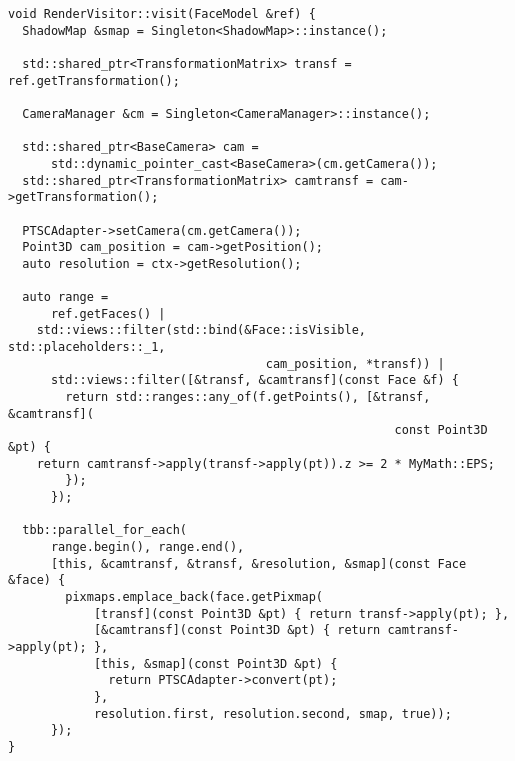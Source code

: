 \begin{lstlisting}[caption={Использование RenderVisitor на модель}, label={lst:render_model}]
void RenderVisitor::visit(FaceModel &ref) {
  ShadowMap &smap = Singleton<ShadowMap>::instance();

  std::shared_ptr<TransformationMatrix> transf = ref.getTransformation();

  CameraManager &cm = Singleton<CameraManager>::instance();

  std::shared_ptr<BaseCamera> cam =
      std::dynamic_pointer_cast<BaseCamera>(cm.getCamera());
  std::shared_ptr<TransformationMatrix> camtransf = cam->getTransformation();

  PTSCAdapter->setCamera(cm.getCamera());
  Point3D cam_position = cam->getPosition();
  auto resolution = ctx->getResolution();

  auto range =
      ref.getFaces() |
    std::views::filter(std::bind(&Face::isVisible, std::placeholders::_1,
                                    cam_position, *transf)) |
      std::views::filter([&transf, &camtransf](const Face &f) {
        return std::ranges::any_of(f.getPoints(), [&transf, &camtransf](
                                                      const Point3D &pt) {
    return camtransf->apply(transf->apply(pt)).z >= 2 * MyMath::EPS;
        });
      });

  tbb::parallel_for_each(
      range.begin(), range.end(),
      [this, &camtransf, &transf, &resolution, &smap](const Face &face) {
        pixmaps.emplace_back(face.getPixmap(
            [transf](const Point3D &pt) { return transf->apply(pt); },
            [&camtransf](const Point3D &pt) { return camtransf->apply(pt); },
            [this, &smap](const Point3D &pt) {
              return PTSCAdapter->convert(pt);
            },
            resolution.first, resolution.second, smap, true));
      });
}  
\end{lstlisting}

